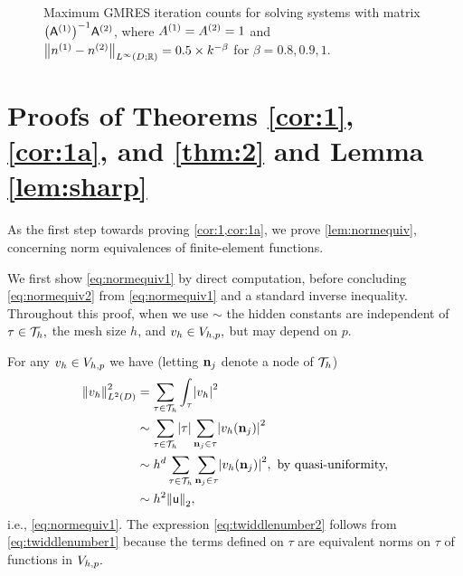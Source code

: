     \begin{figure}
      \centering

   \caption[Maximum GMRES iteration counts when $\NLiDRR{\nso-\nst} = 0.5\times  k^{-\beta}$ for $\beta = 0.8,0.9,1.$]{Maximum GMRES iteration counts for solving systems with matrix $\AmatoI\Amatt$, where ${A}^{(1)}={A}^{(2)}=1$ and $\NLiDRR{\nso-\nst} = 0.5\times  k^{-\beta}$ for $\beta = 0.8,0.9,1.$}\label{fig:linfinityn2}
\end{figure}
  



\section[Proofs of Theorems \MakeLowercase{\ref{cor:1}, \ref{cor:1a}, and \ref{thm:2}} and Lemma \MakeLowercase{\ref{lem:sharp}}]{Proofs of Theorems \ref{cor:1}, \ref{cor:1a}, and \ref{thm:2} and \newline Lemma \ref{lem:sharp}}\label{sec:3}


As the first step towards proving \cref{cor:1,cor:1a}, we prove \cref{lem:normequiv}, concerning norm equivalences of finite-element functions.

\label{page:normequivpf}
We first show \cref{eq:normequiv1} by direct computation, before concluding \cref{eq:normequiv2} from \cref{eq:normequiv1} and a standard inverse inequality. Throughout this proof, when we use $\sim$ the hidden constants are independent of $\tau \in \mathcal T_{h},$ the mesh size $h$, and $v_{h} \in V_{h,p},$ but may depend on $p.$

For any $v_{h} \in V_{h,p}$ we have (letting $\mathbf{n}_{j}$ denote a node of $\mathcal T_{h}$)
\begin{align}
  \NLtD{\vh}^2 &= \sum_{\tau \in \Th} \int_\tau \abs{\vh}^2\label{eq:twiddlenumber1}\\
  &\sim \sum_{\tau \in \Th} \abs{\tau} \sum_{\bnj \in \tau} \abs{\vh(\bnj)}^2 \label{eq:twiddlenumber2}\\
  &\sim h^d \sum_{\tau \in \Th} \sum_{\bnj \in \tau} \abs{\vh(\bnj)}^2, \text{ by quasi-uniformity,}\nonumber\\
  &\sim h^2 \Nt{\uvec},
\end{align}
i.e., \cref{eq:normequiv1}. The expression \cref{eq:twiddlenumber2} follows from \cref{eq:twiddlenumber1} because the terms defined on $\tau$ are equivalent norms on $\tau$ of functions in $V_{h,p}.$

